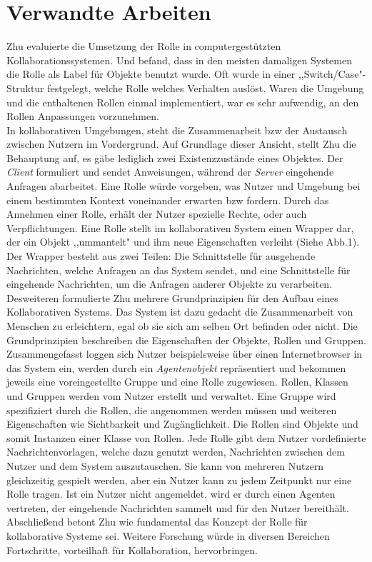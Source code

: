 \documentclass[conference]{IEEEtran}
\begin{document}
\section{Verwandte Arbeiten} Zhu evaluierte die Umsetzung der Rolle in computergestützten Kollaborationssystemen\cite{zhu2006role}. Und befand, dass in den meisten damaligen Systemen die Rolle als Label für Objekte benutzt wurde. Oft wurde in einer ,,Switch/Case"-Struktur festgelegt, welche Rolle welches Verhalten auslöst. Waren die Umgebung  und die enthaltenen Rollen einmal implementiert, war es sehr aufwendig, an den Rollen Anpassungen vorzunehmen.\\ In kollaborativen Umgebungen, steht die Zusammenarbeit bzw der Austausch zwischen Nutzern im Vordergrund. Auf Grundlage dieser Ansicht, stellt Zhu die Behauptung auf, es gäbe lediglich zwei Existenzzustände eines Objektes. Der \textit{Client} formuliert und sendet Anweisungen, während der \textit{Server} eingehende Anfragen abarbeitet. Eine Rolle würde vorgeben, was Nutzer und Umgebung bei einem bestimmten Kontext voneinander erwarten bzw fordern. Durch das Annehmen einer Rolle, erhält der Nutzer spezielle Rechte, oder auch Verpflichtungen. Eine Rolle stellt im kollaborativen System einen Wrapper dar, der ein Objekt ,,ummantelt" und ihm neue Eigenschaften verleiht (Siehe Abb.1). Der Wrapper besteht aus zwei Teilen: Die Schnittstelle für ausgehende Nachrichten, welche Anfragen an das System sendet, und eine Schnittstelle für eingehende Nachrichten, um die Anfragen anderer Objekte zu verarbeiten. \\ Desweiteren formulierte Zhu mehrere Grundprinzipien für den Aufbau eines Kollaborativen Systems. Das System ist dazu gedacht die Zusammenarbeit von Menschen zu erleichtern, egal ob sie sich am selben Ort befinden oder nicht. Die Grundprinzipien beschreiben die Eigenschaften der Objekte, Rollen und Gruppen. Zusammengefasst loggen sich Nutzer beispielsweise über einen Internetbrowser in das System ein, werden durch ein \textit{Agentenobjekt} repräsentiert und bekommen jeweils eine voreingestellte Gruppe und eine Rolle zugewiesen. Rollen, Klassen und Gruppen werden vom Nutzer erstellt und verwaltet. Eine Gruppe wird spezifiziert durch die Rollen, die angenommen werden müssen und weiteren Eigenschaften wie Sichtbarkeit und Zugänglichkeit. Die Rollen sind Objekte und somit Instanzen einer Klasse von Rollen. Jede Rolle gibt dem Nutzer vordefinierte Nachrichtenvorlagen, welche dazu genutzt werden, Nachrichten zwischen dem Nutzer und dem System auszutauschen. Sie kann von mehreren Nutzern gleichzeitig gespielt werden, aber ein Nutzer kann zu jedem Zeitpunkt nur eine Rolle tragen. Ist ein Nutzer nicht angemeldet, wird er durch einen Agenten vertreten, der eingehende Nachrichten sammelt und für den Nutzer bereithält.\\ Abschließend betont Zhu wie fundamental das Konzept der Rolle für kollaborative Systeme sei. Weitere Forschung würde in diversen Bereichen Fortschritte, vorteilhaft für Kollaboration, hervorbringen.
\end{document}
